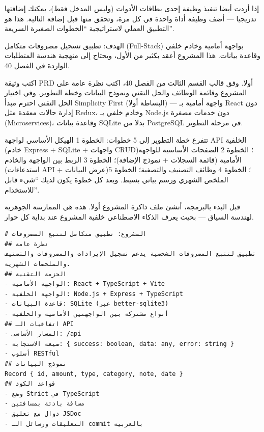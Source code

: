 إذا أردت أيضا تنفيذ وظيفة إحدى بطاقات الأدوات (وليس المدخل فقط)، يمكنك إضافتها تدريجيا — أضف وظيفة أداة واحدة في كل مرة، وتحقق منها قبل إضافة التالية. هذا هو التطبيق العملي لاستراتيجية “الخطوات الصغيرة السريعة”.



الهدف: تطبيق تسجيل مصروفات متكامل (Full-Stack) بواجهة أمامية وخادم خلفي وقاعدة بيانات. هذا المشروع أعقد بكثير من الأول، ويحتاج إلى منهجية هندسة المتطلبات الواردة في الفصل 40.

اكتب وثيقة PRD أولا. وفق قالب القسم الثالث من الفصل 40، اكتب نظرة عامة على المشروع وقائمة الوظائف والحل التقني ونموذج البيانات وخطة التطوير. وفي اختيار الحل التقني احترم مبدأ Simplicity First (البساطة أولا) — واجهة أمامية بـ React دون إدارة حالات معقدة مثل Redux، وخادم خلفي بـ Node.js دون خدمات مصغرة (Microservices)، وقاعدة بيانات SQLite بدلا من PostgreSQL في مرحلة التطوير.

تتفرع خطة التطوير إلى 5 خطوات: الخطوة 1 الهيكل الأساسي لواجهة API الخلفية (خادم Express + SQLite + واجهات CRUD)؛ الخطوة 2 الصفحات الأساسية للواجهة الأمامية (قائمة السجلات + نموذج الإضافة)؛ الخطوة 3 الربط بين الواجهة والخادم (استدعاءات API + عرض البيانات)؛ الخطوة 4 وظائف التصنيف والتصفية؛ الخطوة 5 الملخص الشهري ورسم بياني بسيط. وبعد كل خطوة يكون لديك “شيء قابل للاستخدام”.


قبل البدء بالبرمجة، أنشئ ملف ذاكرة المشروع أولا. هذه هي الممارسة الجوهرية لهندسة السياق — بحيث يعرف الذكاء الاصطناعي خلفية المشروع عند بداية كل حوار.

\begin{lstlisting}
# المشروع: تطبيق متكامل لتتبع المصروفات
## نظرة عامة
تطبيق لتتبع المصروفات الشخصية يدعم تسجيل الإيرادات والمصروفات والتصنيف والملخصات الشهرية.
## الحزمة التقنية
- الواجهة الأمامية: React + TypeScript + Vite
- الواجهة الخلفية: Node.js + Express + TypeScript
- قاعدة البيانات: SQLite (عبر better-sqlite3)
- أنواع مشتركة بين الواجهتين الأمامية والخلفية
## اتفاقيات الـ API
- المسار الأساسي: /api
- صيغة الاستجابة: { success: boolean, data: any, error: string }
- أسلوب RESTful
## نموذج البيانات
Record { id, amount, type, category, note, date }
## قواعد الكود
- وضع Strict في TypeScript
- مسافة بادئة بمسافتين
- دوال مع تعليق JSDoc
- التعليقات ورسائل الـ commit بالعربية
\end{lstlisting}

